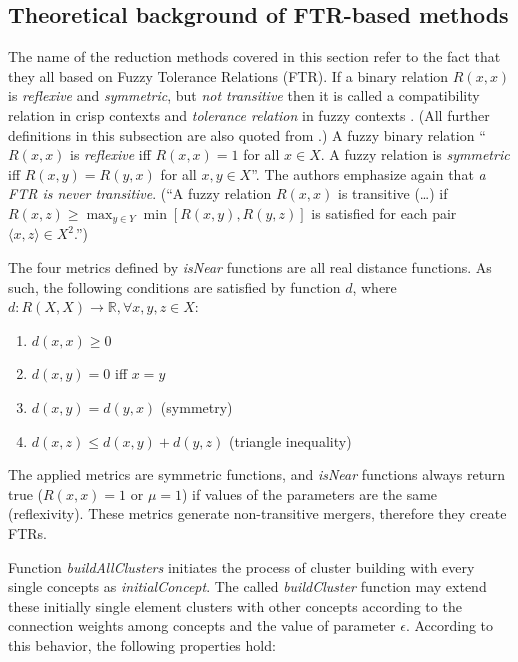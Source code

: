\documentclass[graybox]{svmult}
\begin{document}
\subsection{Theoretical background of FTR-based methods}
\label{sec:theoryFTR}

The name of the reduction methods covered in this section refer to the 
fact that they all based on Fuzzy Tolerance Relations (FTR). If a 
binary relation $R(x,x)$ is \emph{reflexive} and \emph{symmetric}, but 
\emph{not transitive} then it is called a compatibility relation in 
crisp contexts and \emph{tolerance relation} in fuzzy contexts 
\cite{klirg.j.yuanb.1995}. (All further definitions in this subsection 
are also quoted from \cite{klirg.j.yuanb.1995}.) A fuzzy binary 
relation ``$R(x,x)$ is \emph{reflexive} iff $R(x,x) = 1$ for all $x\in 
X$. A fuzzy relation is \emph{symmetric} iff $R(x,y)=R(y,x)$ for all 
$x,y\in X$''. The authors emphasize again that \emph{a FTR is never 
transitive}. (``A fuzzy relation $R(x,x)$ is transitive (\dots) if 
$R(x,z)\geq \max_{y\in Y}\min[R(x,y), R(y,z)]$ is satisfied for each 
pair $\langle x,z\rangle\in X^2$.'')

The four metrics defined by \emph{isNear} functions are all real 
distance functions. As such, the following conditions are satisfied by 
function $d$, where $d:R(X,X)\rightarrow \mathbb{R}, \forall x,y,z \in 
X$:

\begin{enumerate}
\item $d(x,x) \geq 0$
\item $d(x,y) = 0$ iff $x=y$
\item $d(x,y) = d(y,x)$ (symmetry)
\item $d(x,z) \leq d(x,y) + d(y,z)$ (triangle inequality)
\end{enumerate}

The applied metrics are symmetric functions, and \emph{isNear} 
functions always return true ($R(x,x) = 1$ or $\mu = 1$) if values of 
the parameters are the same (reflexivity). These metrics generate 
non-transitive mergers, therefore they create FTRs.

Function \emph{buildAllClusters} initiates the process of cluster 
building with every single concepts as \emph{initialConcept}. The called 
\emph{buildCluster} function may extend these initially single element 
clusters with other concepts according to the connection weights among 
concepts and the value of parameter $\epsilon$. According to this 
behavior, the following properties hold:
\end{document}

